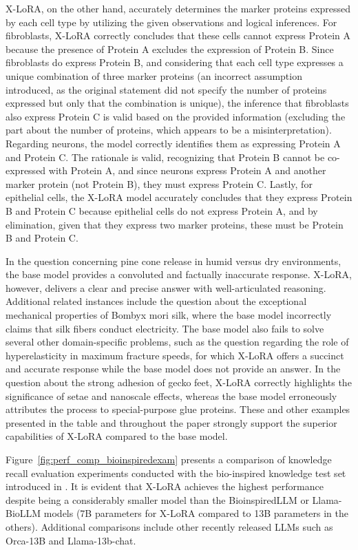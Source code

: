 X-LoRA, on the other hand, accurately determines the marker proteins expressed by each cell type by utilizing the given observations and logical inferences. For fibroblasts, X-LoRA correctly concludes that these cells cannot express Protein A because the presence of Protein A excludes the expression of Protein B. Since fibroblasts do express Protein B, and considering that each cell type expresses a unique combination of three marker proteins (an incorrect assumption introduced, as the original statement did not specify the number of proteins expressed but only that the combination is unique), the inference that fibroblasts also express Protein C is valid based on the provided information (excluding the part about the number of proteins, which appears to be a misinterpretation). Regarding neurons, the model correctly identifies them as expressing Protein A and Protein C. The rationale is valid, recognizing that Protein B cannot be co-expressed with Protein A, and since neurons express Protein A and another marker protein (not Protein B), they must express Protein C. Lastly, for epithelial cells, the X-LoRA model accurately concludes that they express Protein B and Protein C because epithelial cells do not express Protein A, and by elimination, given that they express two marker proteins, these must be Protein B and Protein C.

In the question concerning pine cone release in humid versus dry environments, the base model provides a convoluted and factually inaccurate response. X-LoRA, however, delivers a clear and precise answer with well-articulated reasoning. Additional related instances include the question about the exceptional mechanical properties of Bombyx mori silk, where the base model incorrectly claims that silk fibers conduct electricity. The base model also fails to solve several other domain-specific problems, such as the question regarding the role of hyperelasticity in maximum fracture speeds, for which X-LoRA offers a succinct and accurate response while the base model does not provide an answer. In the question about the strong adhesion of gecko feet, X-LoRA correctly highlights the significance of setae and nanoscale effects, whereas the base model erroneously attributes the process to special-purpose glue proteins. These and other examples presented in the table and throughout the paper strongly support the superior capabilities of X-LoRA compared to the base model.

Figure~\ref{fig:perf_comp_bioinspiredexam} presents a comparison of knowledge recall evaluation experiments conducted with the bio-inspired knowledge test set introduced in \cite{Luu2023BioinspiredLLM:Materials}. It is evident that X-LoRA achieves the highest performance despite being a considerably smaller model than the BioinspiredLLM or Llama-BioLLM models (7B parameters for X-LoRA compared to 13B parameters in the others). Additional comparisons include other recently released LLMs such as Orca-13B and Llama-13b-chat.

